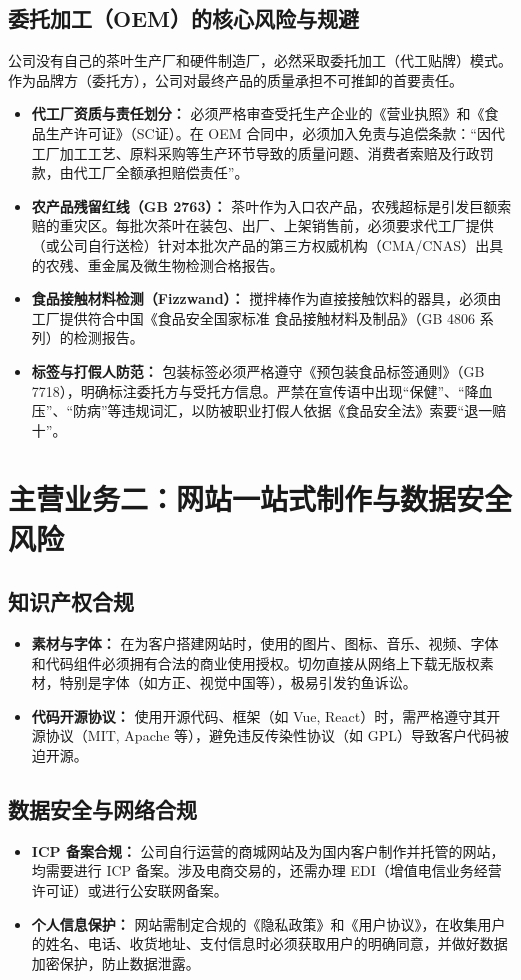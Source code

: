 \documentclass[a4paper, 12pt]{ctexart}
\begin{document}
\subsection{委托加工（OEM）的核心风险与规避}
公司没有自己的茶叶生产厂和硬件制造厂，必然采取委托加工（代工贴牌）模式。作为品牌方（委托方），公司对最终产品的质量承担不可推卸的首要责任。
\begin{itemize}
    \item \textbf{代工厂资质与责任划分：} 必须严格审查受托生产企业的《营业执照》和《食品生产许可证》（SC证）。在 OEM 合同中，必须加入免责与追偿条款：“因代工厂加工工艺、原料采购等生产环节导致的质量问题、消费者索赔及行政罚款，由代工厂全额承担赔偿责任”。
    \item \textbf{农产品残留红线（GB 2763）：} 茶叶作为入口农产品，农残超标是引发巨额索赔的重灾区。每批次茶叶在装包、出厂、上架销售前，必须要求代工厂提供（或公司自行送检）针对本批次产品的第三方权威机构（CMA/CNAS）出具的农残、重金属及微生物检测合格报告。
    \item \textbf{食品接触材料检测（Fizzwand）：} 搅拌棒作为直接接触饮料的器具，必须由工厂提供符合中国《食品安全国家标准 食品接触材料及制品》（GB 4806 系列）的检测报告。
    \item \textbf{标签与打假人防范：} 包装标签必须严格遵守《预包装食品标签通则》（GB 7718），明确标注委托方与受托方信息。严禁在宣传语中出现“保健”、“降血压”、“防病”等违规词汇，以防被职业打假人依据《食品安全法》索要“退一赔十”。
\end{itemize}

\section{主营业务二：网站一站式制作与数据安全风险}
\subsection{知识产权合规}
\begin{itemize}
    \item \textbf{素材与字体：} 在为客户搭建网站时，使用的图片、图标、音乐、视频、字体和代码组件必须拥有合法的商业使用授权。切勿直接从网络上下载无版权素材，特别是字体（如方正、视觉中国等），极易引发钓鱼诉讼。
    \item \textbf{代码开源协议：} 使用开源代码、框架（如 Vue, React）时，需严格遵守其开源协议（MIT, Apache 等），避免违反传染性协议（如 GPL）导致客户代码被迫开源。
\end{itemize}
\subsection{数据安全与网络合规}
\begin{itemize}
    \item \textbf{ICP 备案合规：} 公司自行运营的商城网站及为国内客户制作并托管的网站，均需要进行 ICP 备案。涉及电商交易的，还需办理 EDI（增值电信业务经营许可证）或进行公安联网备案。
    \item \textbf{个人信息保护：} 网站需制定合规的《隐私政策》和《用户协议》，在收集用户的姓名、电话、收货地址、支付信息时必须获取用户的明确同意，并做好数据加密保护，防止数据泄露。
\end{itemize}
\end{document}
